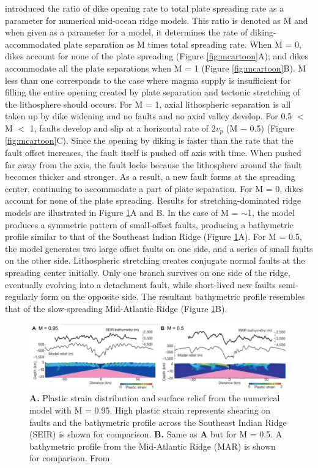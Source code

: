 \documentclass[letterpaper,12pt,notitle]{memphisthesis}                     %
\begin{document}
\citet{Buck2005} introduced the ratio of dike opening rate to total plate spreading rate as a parameter for numerical mid-ocean ridge models. This ratio is denoted as M and when given as a parameter for a model, it determines the rate of diking-accommodated plate separation as M times total spreading rate. When M = 0, dikes account for none of the plate spreading (Figure \ref{fig:mcartoon}A); and dikes accommodate all the plate separations when M = 1 (Figure \ref{fig:mcartoon}B). M less than one corresponds to the case where magma supply is insufficient for filling the entire opening created by plate separation and tectonic stretching of the lithosphere should occurs. For M = 1, axial lithospheric separation is all taken up by dike widening and no faults and no axial valley develop.  For 0.5 $<$ M $<$ 1, faults develop and slip at a horizontal rate of 2$v_p$ (M $-$ 0.5) (Figure \ref{fig:mcartoon}C). Since the opening by diking is faster than the rate that the fault offset increases, the fault itself is pushed off axis with time. When pushed far away from the axis, the fault locks because the lithosphere around the fault becomes thicker and stronger. As a result, a new fault forms at the spreading center, continuing to accommodate a part of plate separation. For M = 0, dikes account for none of the plate spreading. Results for stretching-dominated ridge models are illustrated in Figure \ref{fig:mfactor}A and B. In the case of M = $\sim$1, the model produces a symmetric pattern of small-offset faults, producing a bathymetric profile similar to that of the Southeast Indian Ridge (Figure \ref{fig:mfactor}A). For M = 0.5, the model generates two large offset faults on one side, and a series of small faults on the other side. Lithospheric stretching creates conjugate normal faults at the spreading center initially. Only one branch survives on one side of the ridge, eventually evolving into a detachment fault, while short-lived new faults semi-regularly form on the opposite side. The resultant bathymetric profile resembles that of the slow-spreading Mid-Atlantic Ridge (Figure \ref{fig:mfactor}B).
%
\begin{figure}[!htb]
	\centering
	\includegraphics[width=0.99\linewidth]{./figs/fig1.pdf}
	\caption{\textbf{A.} Plastic strain distribution and surface relief from the numerical model with M = 0.95. High plastic strain represents shearing on faults and the bathymetric profile across the Southeast Indian Ridge (SEIR) is shown for comparison. \textbf{B.} Same as \textbf{A} but for M = 0.5. A bathymetric profile from the Mid-Atlantic Ridge (MAR) is shown for comparison. From \citet{Buck2005}}
	\label{fig:mfactor}
\end{figure}
\end{document}

